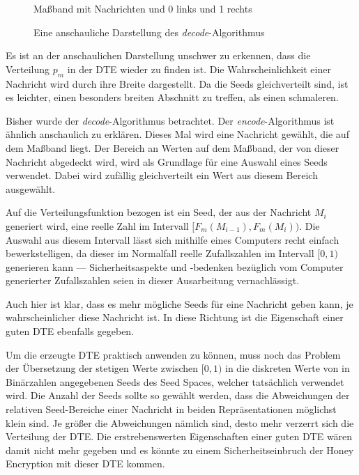 \begin{figure}[!h]
Maßband mit Nachrichten und 0 links und 1 rechts
\caption{Eine anschauliche Darstellung des \emph{decode}-Algorithmus}
\label{fig:decode}
\end{figure}

Es ist an der anschaulichen Darstellung unschwer zu erkennen, dass die Verteilung $p_m$ in der DTE wieder zu finden ist. Die Wahrscheinlichkeit einer Nachricht wird durch ihre Breite dargestellt. Da die Seeds gleichverteilt sind, ist es leichter, einen besonders breiten Abschnitt zu treffen, als einen schmaleren.

Bisher wurde der \emph{decode}-Algorithmus betrachtet. Der \emph{encode}-Algorithmus ist ähnlich anschaulich zu erklären. Dieses Mal wird eine Nachricht gewählt, die auf dem Maßband liegt. Der Bereich an Werten auf dem Maßband, der von dieser Nachricht abgedeckt wird, wird als Grundlage für eine Auswahl eines Seeds verwendet. Dabei wird zufällig gleichverteilt ein Wert aus diesem Bereich ausgewählt.

Auf die Verteilungsfunktion bezogen ist ein Seed, der aus der Nachricht $M_i$ generiert wird, eine reelle Zahl im Intervall $[F_m(M_{i-1}), F_m(M_i))$. Die Auswahl aus diesem Intervall lässt sich mithilfe eines Computers recht einfach bewerkstelligen, da dieser im Normalfall reelle Zufallszahlen im Intervall $[0,1)$ generieren kann --- Sicherheitsaspekte und -bedenken bezüglich vom Computer generierter Zufallszahlen seien in dieser Ausarbeitung vernachlässigt.

Auch hier ist klar, dass es mehr mögliche Seeds für eine Nachricht geben kann, je wahrscheinlicher diese Nachricht ist. In diese Richtung ist die Eigenschaft einer guten DTE ebenfalls gegeben.

Um die erzeugte DTE praktisch anwenden zu können, muss noch das Problem der Übersetzung der stetigen Werte zwischen $[0,1)$ in die diskreten Werte von in Binärzahlen angegebenen Seeds des Seed Spaces, welcher tatsächlich verwendet wird. Die Anzahl der Seeds sollte so gewählt werden, dass die Abweichungen der relativen Seed-Bereiche einer Nachricht in beiden Repräsentationen möglichst klein sind. Je größer die Abweichungen nämlich sind, desto mehr verzerrt sich die Verteilung der DTE. Die erstrebenswerten Eigenschaften einer guten DTE wären damit nicht mehr gegeben und es könnte zu einem Sicherheitseinbruch der Honey Encryption mit dieser DTE kommen.

\newpage